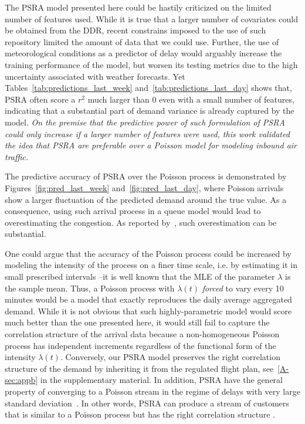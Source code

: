 \documentclass[final,review]{elsarticle}
\makeatletter
\newcommand*{\ie}{i.e.\@\xspace}
\makeatother
\begin{document}
  The \ac{PSRA} model presented here could be hastily criticized on the limited number of features used.
  While it is true that a larger number of covariates could be obtained from the \ac{DDR}, recent constrains imposed to the use of such repository limited the amount of data that we could use.
  Further, the use of meteorological conditions as a predictor of delay would arguably increase the training performance of the model, but worsen its testing metrics due to the high uncertainty associated with weather forecasts.
  Yet Tables~\ref{tab:predictions_last_week} and~\ref{tab:predictions_last_day} shows that, \ac{PSRA} often score a \(r^2\) much larger than 0 even with a small number of features, indicating that a substantial part of demand variance is already captured by the model.
  \emph{On the premise that the predictive power of such formulation of \ac{PSRA} could only increase if a larger number of features were used, this work validated the idea that \ac{PSRA} are preferable over a Poisson model for modeling inbound air traffic.}

  The predictive accuracy of \ac{PSRA} over the Poisson process is demonstrated by Figures~\ref{fig:pred_last_week} and~\ref{fig:pred_last_day}, where Poisson arrivals show a larger fluctuation of the predicted demand around the true value.
  As a consequence, using such arrival process in a queue model would lead to overestimating the congestion.
  As reported by~\citet{caccavale2014model}, such overestimation can be substantial.

  One could argue that the accuracy of the Poisson process could be increased by modeling the intensity of the process on a finer time scale, \ie{} by estimating it in small prescribed intervals --it is well known that the \ac{MLE} of the parameter \(\lambda\) is the sample mean.
  Thus, a Poisson process with \(\lambda(t)\) \emph{forced} to vary every 10 minutes would be a model that exactly reproduces the daily average aggregated demand.
  While it is not obvious that such highly-parametric model would score much better than the one presented here, it would still fail to capture the correlation structure of the arrival data because a non-homogeneous Poisson process has independent increments regardless of the functional form of the intensity \(\lambda(t)\).
  Conversely, our \ac{PSRA} model preserves the right correlation structure of the demand by inheriting it from the regulated flight plan, see~\ref{A-sec:appb} in the supplementary material.
  In addition, \ac{PSRA} have the general property of converging to a Poisson stream in the regime of delays with very large standard deviation~\citep{guadagni2011queueing}. In other words, PSRA can produce a stream of customers that is similar to a Poisson process but has the right correlation structure .
\end{document}
